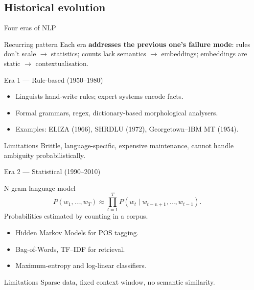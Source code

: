 \documentclass[11pt,aspectratio=169]{beamer}
\begin{document}
\subsection{Historical evolution}

\begin{frame}{Four eras of NLP}
\begin{center}
\end{center}
\vfill
\begin{block}{Recurring pattern}
Each era \textbf{addresses the previous one's failure mode}: rules don't scale $\to$ statistics; counts lack semantics $\to$ embeddings; embeddings are static $\to$ contextualisation.
\end{block}
\end{frame}

\begin{frame}{Era 1 --- Rule-based (1950--1980)}
\begin{itemize}
    \item Linguists hand-write rules; expert systems encode facts.
    \item Formal grammars, regex, dictionary-based morphological analysers.
    \item Examples: ELIZA (1966), SHRDLU (1972), Georgetown--IBM MT (1954).
\end{itemize}
\vfill
\begin{alertblock}{Limitations}
Brittle, language-specific, expensive maintenance, cannot handle ambiguity probabilistically.
\end{alertblock}
\end{frame}

\begin{frame}{Era 2 --- Statistical (1990--2010)}
\begin{block}{N-gram language model}
\[ P(w_1, \dots, w_T) \approx \prod_{t=1}^{T} P(w_t \mid w_{t-n+1}, \dots, w_{t-1}). \]
Probabilities estimated by counting in a corpus.
\end{block}
\begin{itemize}
    \item Hidden Markov Models for POS tagging.
    \item Bag-of-Words, TF--IDF for retrieval.
    \item Maximum-entropy and log-linear classifiers.
\end{itemize}
\begin{alertblock}{Limitations}
Sparse data, fixed context window, no semantic similarity.
\end{alertblock}
\end{frame}
\end{document}
